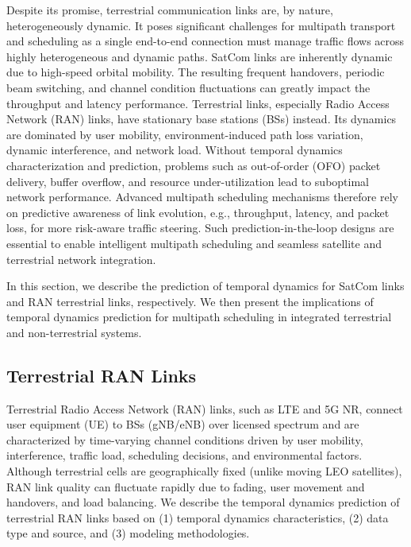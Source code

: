 \documentclass[12pt]{article}
\begin{document}
Despite its promise, terrestrial communication links are, by nature, heterogeneously dynamic. It poses significant challenges for multipath transport and scheduling as a single end-to-end connection must manage traffic flows across highly heterogeneous and dynamic paths. SatCom links are inherently dynamic due to high-speed orbital mobility. The resulting frequent handovers, periodic beam switching, and channel condition fluctuations can greatly impact the throughput and latency performance. Terrestrial links, especially Radio Access Network (RAN) links, have stationary base stations (BSs) instead. Its dynamics are dominated by user mobility, environment-induced path loss variation, dynamic interference, and network load. Without temporal dynamics characterization and prediction, problems such as out-of-order (OFO) packet delivery, buffer overflow, and resource under-utilization lead to suboptimal network performance. Advanced multipath scheduling mechanisms therefore rely on predictive awareness of link evolution, e.g., throughput, latency, and packet loss, for more risk-aware traffic steering. Such prediction-in-the-loop designs are essential to enable intelligent multipath scheduling and seamless satellite and terrestrial network integration.

In this section, we describe the prediction of temporal dynamics for SatCom links and RAN terrestrial links, respectively. We then present the implications of temporal dynamics prediction for multipath scheduling in integrated terrestrial and non-terrestrial systems.


\subsection{Terrestrial RAN Links}

Terrestrial Radio Access Network (RAN) links, such as LTE and 5G NR, connect user equipment (UE) to BSs (gNB/eNB) over licensed spectrum and are characterized by time-varying channel conditions driven by user mobility, interference, traffic load, scheduling decisions, and environmental factors. Although terrestrial cells are geographically fixed (unlike moving LEO satellites), RAN link quality can fluctuate rapidly due to fading, user movement and handovers, and load balancing. We describe the temporal dynamics prediction of terrestrial RAN links based on (1) temporal dynamics characteristics, (2) data type and source, and (3) modeling methodologies. 
\end{document}
